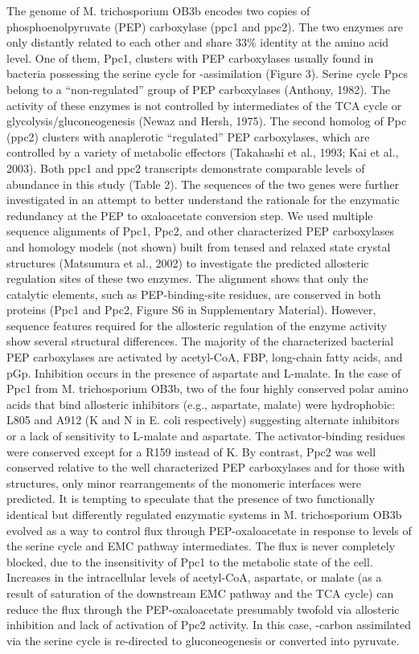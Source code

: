 The genome of M. trichosporium OB3b encodes two copies of phosphoenolpyruvate (PEP) carboxylase (ppc1 and ppc2).
The two enzymes are only distantly related to each other and share 33\% identity at the amino acid level.
One of them, Ppc1, clusters with PEP carboxylases usually found in bacteria possessing the serine cycle for -assimilation (Figure 3).
Serine cycle Ppcs belong to a “non-regulated” group of PEP carboxylases (Anthony, 1982).
The activity of these enzymes is not controlled by intermediates of the TCA cycle or glycolysis/gluconeogenesis (Newaz and Hersh, 1975).
The second homolog of Ppc (ppc2) clusters with anaplerotic “regulated” PEP carboxylases, which are controlled by a variety of metabolic effectors (Takahashi et al., 1993; Kai et al., 2003).
Both ppc1 and ppc2 transcripts demonstrate comparable levels of abundance in this study (Table 2).
The sequences of the two genes were further investigated in an attempt to better understand the rationale for the enzymatic redundancy at the PEP to oxaloacetate conversion step.
We used multiple sequence alignments of Ppc1, Ppc2, and other characterized PEP carboxylases and homology models (not shown) built from tensed and relaxed state crystal structures (Matsumura et al., 2002) to investigate the predicted allosteric regulation sites of these two enzymes.
The alignment shows that only the catalytic elements, such as PEP-binding-site residues, are conserved in both proteins (Ppc1 and Ppc2, Figure S6 in Supplementary Material).
However, sequence features required for the allosteric regulation of the enzyme activity show several structural differences.
The majority of the characterized bacterial PEP carboxylases are activated by acetyl-CoA, FBP, long-chain fatty acids, and pGp.
Inhibition occurs in the presence of aspartate and L-malate.
In the case of Ppc1 from M. trichosporium OB3b, two of the four highly conserved polar amino acids that bind allosteric inhibitors (e.g., aspartate, malate) were hydrophobic: L805 and A912 (K and N in E. coli respectively) suggesting alternate inhibitors or a lack of sensitivity to L-malate and aspartate.
The activator-binding residues were conserved except for a R159 instead of K.
By contrast, Ppc2 was well conserved relative to the well characterized PEP carboxylases and for those with structures, only minor rearrangements of the monomeric interfaces were predicted.
It is tempting to speculate that the presence of two functionally identical but differently regulated enzymatic systems in M. trichosporium OB3b evolved as a way to control flux through PEP-oxaloacetate in response to levels of the serine cycle and EMC pathway intermediates.
The flux is never completely blocked, due to the insensitivity of Ppc1 to the metabolic state of the cell.
Increases in the intracellular levels of acetyl-CoA, aspartate, or malate (as a result of saturation of the downstream EMC pathway and the TCA cycle) can reduce the flux through the PEP-oxaloacetate presumably twofold via allosteric inhibition and lack of activation of Ppc2 activity.
In this case, -carbon assimilated via the serine cycle is re-directed to gluconeogenesis or converted into pyruvate.

